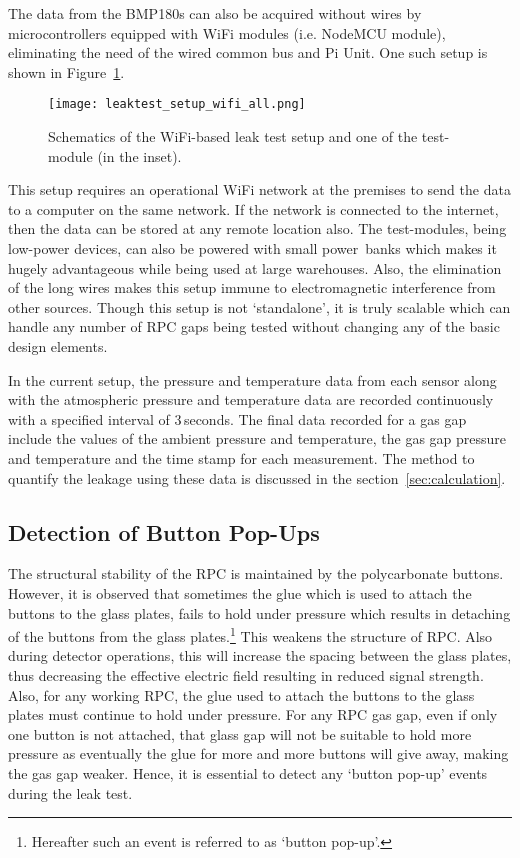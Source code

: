 The data from the BMP180s can also be acquired without wires by
microcontrollers equipped with WiFi modules (i.e. NodeMCU
module\cite{nodemcu2015}), eliminating the need of the wired common bus and
Pi Unit. One such setup is shown in Figure~\ref{fig:leakwifi}. 
\begin{figure}
  \centering
  \texttt{[image: leaktest\_setup\_wifi\_all.png]}
  \caption{Schematics of the WiFi-based leak test setup and one of the
    test-module (in the inset).}
  \label{fig:leakwifi}
\end{figure}
This setup requires an operational WiFi network at the premises to send the
data to a computer on the same network. If the network is connected to the
internet, then the data can be stored at any remote location also. The
test-modules, being low-power devices, can also be powered with small
power~banks which makes it hugely advantageous while being used at large
warehouses. Also, the elimination of the long wires makes this setup immune
to electromagnetic interference from other sources. Though this setup is not
`standalone', it is truly scalable which can handle any number of RPC gaps
being tested without changing any of the basic design elements.

In the current setup, the pressure and temperature data from each
sensor along with the atmospheric pressure and temperature data are
recorded continuously with a specified interval of $3$\,seconds.
The final data recorded for a gas gap include the values of the
ambient pressure and temperature, the gas gap pressure and temperature
and the time stamp for each measurement. %
The method to quantify the leakage using these data is discussed in the
section~\ref{sec:calculation}.

\subsection{Detection of Button Pop-Ups}\label{sec:button}
The structural stability of the RPC is maintained by the polycarbonate
buttons. However, it is observed that sometimes the glue which is used
to attach the buttons to the glass plates, fails to hold under
pressure which results in detaching of the buttons from the glass
plates.\footnote{Hereafter such an event is referred to as
  `button pop-up'.}
This weakens the structure of RPC. Also during detector operations,
this will increase the spacing between the glass plates, thus
decreasing the effective electric field resulting in reduced signal
strength. Also, for any working RPC, the glue used to attach the
buttons to the glass plates must continue to hold under pressure.
For any RPC gas gap, even if only one button is not attached, that
glass gap will not be suitable to hold more pressure as eventually the
glue for more and more buttons will give away, making the gas gap
weaker. Hence, it is essential to detect any `button pop-up' events
during the leak test.

